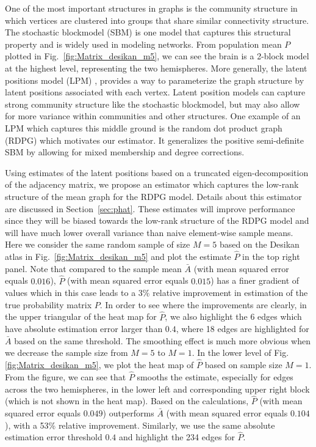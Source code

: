\documentclass[10pt,letterpaper]{article}
\renewcommand{\hat}{\widehat}
\begin{document}
One of the most important structures in graphs is the community structure in which vertices are clustered into groups that share similar connectivity structure. The stochastic blockmodel (SBM) \citep{holland1983stochastic} is one model that captures this structural property and is widely used in modeling networks. From population mean $P$ plotted in Fig.~\ref{fig:Matrix_desikan_m5}, we can see the brain is a 2-block model at the highest level, representing the two hemispheres.
More generally, the latent positions model (LPM) \citep{hoff2002latent}, provides a way to parameterize the graph structure by latent positions associated with each vertex. 
Latent position models can capture strong community structure like the stochastic blockmodel, but may also allow for more variance within communities and other structures.
One example of an LPM which captures this middle ground is the random dot product graph (RDPG) \citep{young2007random, nickel2007random} which motivates our estimator. It generalizes the positive semi-definite SBM by allowing for mixed membership and degree corrections.

Using estimates of the latent positions based on a truncated eigen-decomposition of the adjacency matrix, we propose an estimator which captures the low-rank structure of the mean graph for the RDPG model. Details about this estimator are discussed in Section~\ref{sec:phat}.
These estimates will improve performance since they will be biased towards the low-rank structure of the RDPG model and will have much lower overall variance than naive element-wise sample means. Here we consider the same random sample of size $M=5$ based on the Desikan atlas in Fig.~\ref{fig:Matrix_desikan_m5} and plot the estimate $\hat{P}$ in the top right panel. Note that compared to the sample mean $\bar{A}$ (with mean squared error equals $0.016$), $\hat{P}$ (with mean squared error equals $0.015$) has a finer gradient of values which in this case leads to a 3\% relative improvement in estimation of the true probability matrix $P$. In order to see where the improvements are clearly, in the upper triangular of the heat map for $\hat{P}$, we also highlight the 6 edges which have absolute estimation error larger than $0.4$, where 18 edges are highlighted for $\bar{A}$ based on the same threshold. 
The smoothing effect is much more obvious when we decrease the sample size from $M = 5$ to $M = 1$. In the lower level of Fig.\ref{fig:Matrix_desikan_m5}, we plot the heat map of $\hat{P}$ based on sample size $M = 1$. From the figure, we can see that $\hat{P}$ smooths the estimate, especially for edges across the two hemispheres, in the lower left and corresponding upper right block (which is not shown in the heat map). Based on the calculations, $\hat{P}$ (with mean squared error equals $0.049$) outperforms $\bar{A}$ (with mean squared error equals $0.104$), with a 53\% relative improvement. Similarly, we use the same absolute estimation error threshold $0.4$ and highlight the 234 edges for $\hat{P}$.
\end{document}
